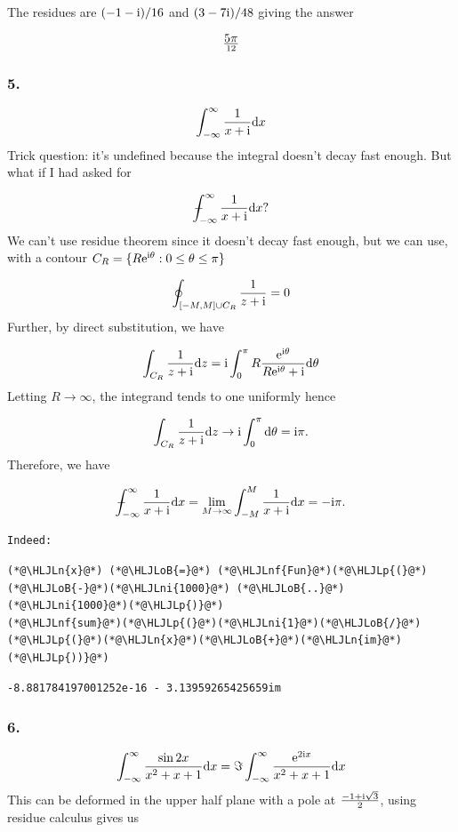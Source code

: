 \documentclass[12pt,a4paper]{article}
\newcommand{\HLJLn}[1]{#1}
\newcommand{\HLJLnf}[1]{\textcolor[RGB]{66,102,213}{#1}}
\newcommand{\HLJLni}[1]{\textcolor[RGB]{59,151,46}{#1}}
\newcommand{\HLJLoB}[1]{\textcolor[RGB]{102,102,102}{\textbf{#1}}}
\newcommand{\HLJLp}[1]{#1}
\def\D{ {\rm d} }
\def\I{ {\rm i} }
\def\E{ {\rm e} }
\def\Xint#1{ \mathchoice
   {\XXint\displaystyle\textstyle{#1} }%
   {\XXint\textstyle\scriptstyle{#1} }%
   {\XXint\scriptstyle\scriptscriptstyle{#1} }%
   {\XXint\scriptscriptstyle\scriptscriptstyle{#1} }%
   \!\int}
\def\XXint#1#2#3{ {\setbox0=\hbox{$#1{#2#3}{\int}$}
     \vcenter{\hbox{$#2#3$}}\kern-.5\wd0} }
\def\dashint{\Xint-}
\def\dx{\D x}
\def\dz{\D z}
\begin{document}
The residues are $(-1-\I)/16$ and $(3-7\I)/48$ giving the answer

\[
5\pi \over 12
\]
\subsubsection{5.}
\[
	\int_{-\infty}^\infty    {1 \over x + \I } \dx
\]
Trick question: it's undefined because the integral doesn't decay fast enough. But what if I had asked for 

\[
	\dashint_{-\infty}^\infty    {1 \over x + \I } \dx?
\]
We can't use residue theorem since it doesn't decay fast enough, but we can use, with a contour $C_R = \{ R \E^{\I \theta} : 0 \leq \theta \leq \pi \}$

\[
\oint_{[-M, M] \cup C_R} {1 \over z + \I}   = 0
\]
Further, by direct substitution, we have 

\[
\int_{C_R} {1 \over z + \I}\dz = \I \int_0^\pi  R {\E^{\I \theta} \over R \E^{\I \theta} + \I} \D \theta 
\]
Letting $R \rightarrow \infty$, the integrand tends to one uniformly hence  

\[
 \int_{C_R} {1 \over z + \I}\dz  \rightarrow \I \int_0^\pi  \D \theta  = \I \pi.
\]
Therefore, we have

\[
	\dashint_{-\infty}^\infty    {1 \over x + \I } \dx = \lim_{M\rightarrow \infty} \int_{-M}^M {1 \over x + \I}  \dx =  - \I \pi .
\]
\begin{verbatim}
Indeed:
\end{verbatim}

\begin{lstlisting}
(*@\HLJLn{x}@*) (*@\HLJLoB{=}@*) (*@\HLJLnf{Fun}@*)(*@\HLJLp{(}@*)(*@\HLJLoB{-}@*)(*@\HLJLni{1000}@*) (*@\HLJLoB{..}@*) (*@\HLJLni{1000}@*)(*@\HLJLp{)}@*)
(*@\HLJLnf{sum}@*)(*@\HLJLp{(}@*)(*@\HLJLni{1}@*)(*@\HLJLoB{/}@*)(*@\HLJLp{(}@*)(*@\HLJLn{x}@*)(*@\HLJLoB{+}@*)(*@\HLJLn{im}@*)(*@\HLJLp{))}@*)
\end{lstlisting}

\begin{lstlisting}
-8.881784197001252e-16 - 3.13959265425659im
\end{lstlisting}


\subsubsection{6.}
\[
\int_{-\infty}^\infty    {\sin 2x \over x^2 + x + 1} \dx = \Im \int_{-\infty}^\infty    {\E^{ 2 \I x} \over x^2 + x + 1} \dx 
\]
This can be deformed in the upper half plane with a pole at ${-1 + \I \sqrt{3} \over 2}$, using residue calculus gives us
\end{document}
